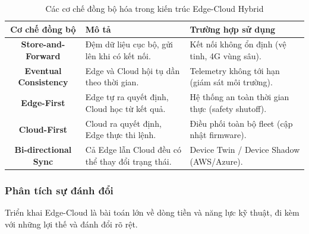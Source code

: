 \begin{table}[H]
\centering
\caption{Các cơ chế đồng bộ hóa trong kiến trúc Edge-Cloud Hybrid}
\begin{tabularx}{\textwidth}{c X X}
\toprule
\textbf{Cơ chế đồng bộ} & \textbf{Mô tả} & \textbf{Trường hợp sử dụng} \\
\hline
\textbf{Store-and-Forward}
  & Đệm dữ liệu cục bộ, gửi lên khi có kết nối.
  & Kết nối không ổn định (vệ tinh, 4G vùng sâu). \\
\hline
\textbf{Eventual Consistency}
  & Edge và Cloud hội tụ dần theo thời gian.
  & Telemetry không tới hạn (giám sát môi trường). \\
\hline
\textbf{Edge-First}
  & Edge tự ra quyết định, Cloud học từ kết quả.
  & Hệ thống an toàn thời gian thực (safety shutoff). \\
\hline
\textbf{Cloud-First}
  & Cloud ra quyết định, Edge thực thi lệnh.
  & Điều phối toàn bộ fleet (cập nhật firmware). \\
\hline
\textbf{Bi-directional Sync}
  & Cả Edge lẫn Cloud đều có thể thay đổi trạng thái.
  & Device Twin / Device Shadow (AWS/Azure). \\
\hline
\end{tabularx}
\end{table}

\subsubsection{Phân tích sự đánh đổi}
\label{subsec:edge-cloud-tradeoff}

Triển khai Edge-Cloud là bài toán lớn về dòng tiền và năng lực kỹ thuật, đi kèm với những lợi thế và đánh đổi rõ rệt.

